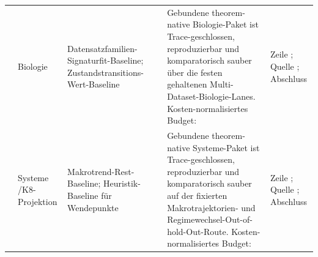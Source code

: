 \begin{longtable}{@{}L{0.14\textwidth}L{0.09\textwidth}L{0.17\textwidth}L{0.10\textwidth}L{0.23\textwidth}L{0.18\textwidth}@{}}
 & Biologie & Datensatzfamilien-Signaturfit-Baseline; Zustandstransitions-Wert-Baseline &  & Gebundene theorem-native Biologie-Paket ist Trace-geschlossen, reproduzierbar und komparatorisch sauber über die festen gehaltenen Multi-Dataset-Biologie-Lanes. \allowbreak Kosten-normalisiertes Budget:  & Zeile ; \allowbreak Quelle ; \allowbreak Abschluss  \\
 & Systeme /\allowbreak K8-Projektion & Makrotrend-Rest-Baseline; Heuristik-Baseline für Wendepunkte &  & Gebundene theorem-native Systeme-Paket ist Trace-geschlossen, reproduzierbar und komparatorisch sauber auf der fixierten Makrotrajektorien- und Regimewechsel-Out-of-hold-Out-Route. \allowbreak Kosten-normalisiertes Budget:  & Zeile ; \allowbreak Quelle ; \allowbreak Abschluss  \\
\bottomrule
\end{longtable}
\endgroup

